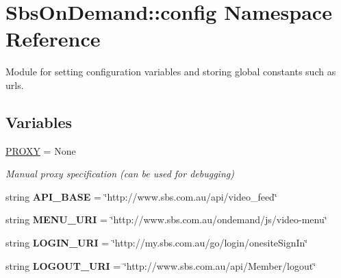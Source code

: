 \hypertarget{namespace_sbs_on_demand_1_1config}{
\section{\-Sbs\-On\-Demand\-:\-:config \-Namespace \-Reference}
\label{namespace_sbs_on_demand_1_1config}
}


\-Module for setting configuration variables and storing global constants such as urls.  


\subsection*{\-Variables}
\begin{DoxyCompactItemize}
\item 
\hyperlink{namespace_sbs_on_demand_1_1config_ab3e6260742211120f0f6f05d4c618711}{\-P\-R\-O\-X\-Y} = \-None
\begin{DoxyCompactList}\small\item\em \-Manual proxy specification (can be used for debugging) \end{DoxyCompactList}\item 
\hypertarget{namespace_sbs_on_demand_1_1config_aa349e71457d310f2012f7aa1686d4111}{
string {\bfseries \-A\-P\-I\-\_\-\-B\-A\-S\-E} = \char`\"{}http\-://www.\-sbs.\-com.\-au/api/video\-\_\-feed\char`\"{}}
\label{namespace_sbs_on_demand_1_1config_aa349e71457d310f2012f7aa1686d4111}

\item 
\hypertarget{namespace_sbs_on_demand_1_1config_ad48120e7856d076813a65b0cc0e54141}{
string {\bfseries \-M\-E\-N\-U\-\_\-\-U\-R\-I} = \char`\"{}http\-://www.\-sbs.\-com.\-au/ondemand/js/video-\/menu\char`\"{}}
\label{namespace_sbs_on_demand_1_1config_ad48120e7856d076813a65b0cc0e54141}

\item 
\hypertarget{namespace_sbs_on_demand_1_1config_aa7f938a4d3b8f3ffada45875c8d2caa6}{
string {\bfseries \-L\-O\-G\-I\-N\-\_\-\-U\-R\-I} = \char`\"{}http\-://my.\-sbs.\-com.\-au/go/login/onesite\-Sign\-In\char`\"{}}
\label{namespace_sbs_on_demand_1_1config_aa7f938a4d3b8f3ffada45875c8d2caa6}

\item 
\hypertarget{namespace_sbs_on_demand_1_1config_a24620d560dacef782ab50c2f85c6235e}{
string {\bfseries \-L\-O\-G\-O\-U\-T\-\_\-\-U\-R\-I} = \char`\"{}http\-://www.\-sbs.\-com.\-au/api/\-Member/logout\char`\"{}}
\label{namespace_sbs_on_demand_1_1config_a24620d560dacef782ab50c2f85c6235e}


\end{DoxyCompactItemize}
